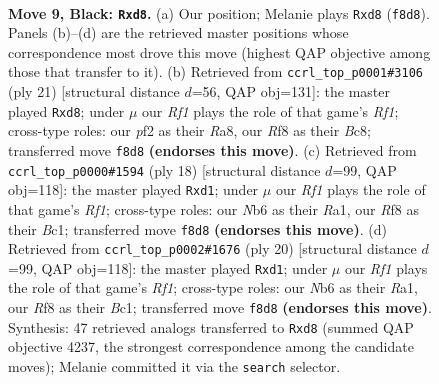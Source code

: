 \documentclass[11pt]{article}
\begin{document}
\clearpage

\begin{figure}[p]\centering
\begin{subfigure}{0.46\textwidth}\centering
\resizebox{\linewidth}{!}{%
\newchessgame
\chessboard[
  setfen={rnbQ1rk1/ppp1ppbp/1n4p1/4P3/7P/1B3N2/PPP2PP1/RNB1K2R b KQ - 0 9},
  showmover=false,
  pgfstyle=straightmove, color=movearrow, markmove={f8-d8}
]}
\caption{}
\end{subfigure}\hfill
\begin{subfigure}{0.46\textwidth}\centering
\resizebox{\linewidth}{!}{%
\newchessgame
\chessboard[
  setfen={r1bQ1rk1/4ppbp/p1p2np1/1p6/4P3/1BN1BP2/PPP3PP/R3K2R b KQ - 0 11},
  showmover=false,
  pgfstyle=straightmove, color=movearrow, markmove={f8-d8}
]}
\caption{}
\end{subfigure}
\\[4pt]
\begin{subfigure}{0.46\textwidth}\centering
\resizebox{\linewidth}{!}{%
\newchessgame
\chessboard[
  setfen={r1b1k2r/1p2bppp/p1n1pn2/2P5/P1B5/2N1PN2/1P3PPP/R1Bq1RK1 w kq - 0 10},
  showmover=false,
  pgfstyle=straightmove, color=movearrow, markmove={f1-d1}
]}
\caption{}
\end{subfigure}\hfill
\begin{subfigure}{0.46\textwidth}\centering
\resizebox{\linewidth}{!}{%
\newchessgame
\chessboard[
  setfen={r1b1k2r/1p2bppp/p1n1pn2/2P5/P1B5/2N1PN2/1P3PPP/R1Bq1RK1 w kq - 0 11},
  showmover=false,
  pgfstyle=straightmove, color=movearrow, markmove={f1-d1}
]}
\caption{}
\end{subfigure}
\caption{\textbf{Move 9, Black: \texttt{Rxd8}.} (a) Our position; Melanie plays \texttt{Rxd8} (\texttt{f8d8}). Panels (b)--(d) are the retrieved master positions whose correspondence most drove this move (highest QAP objective among those that transfer to it). (b) Retrieved from \texttt{ccrl\_top\_p0001\#3106} (ply 21) [structural distance $d$=56, QAP obj=131]: the master played \texttt{Rxd8}; under $\mu$ our \emph{Rf1} plays the role of that game's \emph{Rf1}; cross-type roles: our \emph{p}f2 as their \emph{R}a8, our \emph{R}f8 as their \emph{B}c8; transferred move \texttt{f8d8} \textbf{(endorses this move)}. (c) Retrieved from \texttt{ccrl\_top\_p0000\#1594} (ply 18) [structural distance $d$=99, QAP obj=118]: the master played \texttt{Rxd1}; under $\mu$ our \emph{Rf1} plays the role of that game's \emph{Rf1}; cross-type roles: our \emph{N}b6 as their \emph{R}a1, our \emph{R}f8 as their \emph{B}c1; transferred move \texttt{f8d8} \textbf{(endorses this move)}. (d) Retrieved from \texttt{ccrl\_top\_p0002\#1676} (ply 20) [structural distance $d$=99, QAP obj=118]: the master played \texttt{Rxd1}; under $\mu$ our \emph{Rf1} plays the role of that game's \emph{Rf1}; cross-type roles: our \emph{N}b6 as their \emph{R}a1, our \emph{R}f8 as their \emph{B}c1; transferred move \texttt{f8d8} \textbf{(endorses this move)}. Synthesis: 47 retrieved analogs transferred to \texttt{Rxd8} (summed QAP objective 4237, the strongest correspondence among the candidate moves); Melanie committed it via the \texttt{search} selector.}
\label{fig:thought-m17}
\end{figure}
\end{document}
